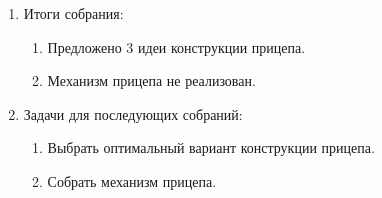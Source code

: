 \begin{enumerate}
\begin{enumerate}
	\end{enumerate}
	
	\item Итоги собрания: 
	\begin{enumerate}
		\item Предложено 3 идеи конструкции прицепа.
		
		\item Механизм прицепа не реализован.
		
	\end{enumerate}
	
	\item Задачи для последующих собраний:
	\begin{enumerate}
		\item Выбрать оптимальный вариант конструкции прицепа.
		
		\item Собрать механизм прицепа.
		
	\end{enumerate}     
\end{enumerate}
\fillpage

